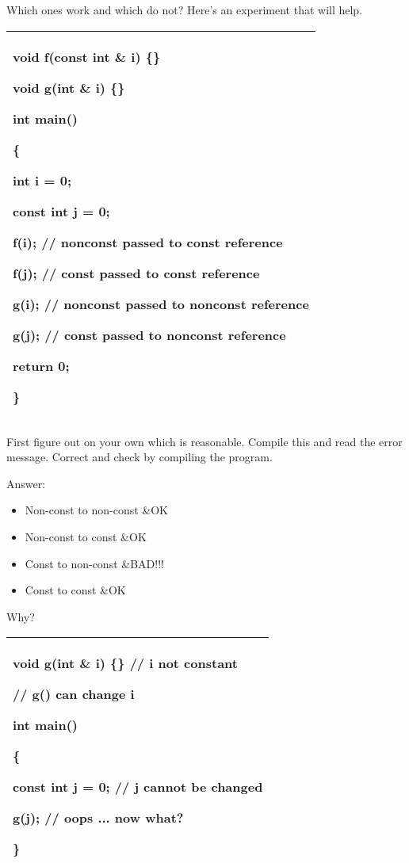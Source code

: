 \documentclass[
]{article}
\providecommand{\tightlist}{%
  \setlength{\itemsep}{0pt}\setlength{\parskip}{0pt}}
\begin{document}
Which ones work and which do not? Here's an experiment that will help.

\begin{longtable}[]{@{}l@{}}
\toprule
\endhead
\begin{minipage}[t]{0.97\columnwidth}\raggedright
void f(const int \& i) \{\}

void g(int \& i) \{\}

int main()

\{

int i = 0;

const int j = 0;

f(i); // nonconst passed to const reference

f(j); // const passed to const reference

g(i); // nonconst passed to nonconst reference

g(j); // const passed to nonconst reference

return 0;

\}\strut
\end{minipage}\tabularnewline
\bottomrule
\end{longtable}

First figure out on your own which is reasonable. Compile this and read
the error message. Correct and check by compiling the program.

Answer:

\begin{itemize}
\tightlist
\item
  Non-const to non-const \&OK
\item
  Non-const to const \&OK
\item
  Const to non-const \&BAD!!!
\item
  Const to const \&OK
\end{itemize}

Why?

\begin{longtable}[]{@{}l@{}}
\toprule
\endhead
\begin{minipage}[t]{0.97\columnwidth}\raggedright
void g(int \& i) \{\} // i not constant

// g() can change i

int main()

\{

const int j = 0; // j cannot be changed

g(j); // oops ... now what?

\}\strut
\end{minipage}\tabularnewline
\bottomrule
\end{longtable}
\end{document}
